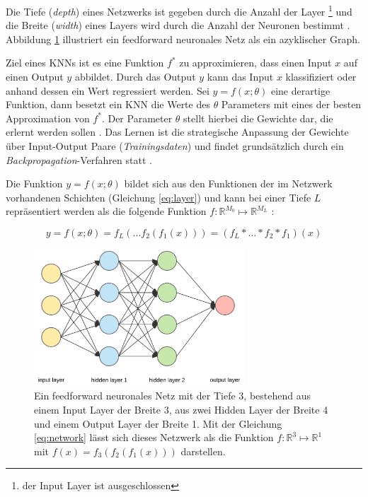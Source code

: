 Die Tiefe (\textit{depth}) eines Netzwerks ist gegeben durch die Anzahl der Layer \footnote{der Input Layer ist ausgeschlossen} und die Breite (\textit{width}) eines Layers wird durch die Anzahl der Neuronen bestimmt \cite{Goodfellow-et-al-2016}. 
Abbildung \ref{fig:neural_net} illustriert ein feedforward neuronales Netz als ein azyklischer Graph.

Ziel eines KNNs ist es eine Funktion $f^*$ zu approximieren, dass einen Input $x$ auf einen Output $y$ abbildet. Durch das Output $y$ kann das Input $x$ klassifiziert oder anhand dessen ein Wert regressiert werden. Sei $y = f(x; \theta)$ eine derartige Funktion, dann besetzt ein KNN die Werte des $\theta$ Parameters mit eines der besten Approximation von $f^*$. Der Parameter $\theta$ stellt hierbei die Gewichte dar, die erlernt werden sollen \cite{Goodfellow-et-al-2016}. 
Das Lernen ist die strategische Anpassung der Gewichte über Input-Output Paare (\textit{Trainingsdaten}) und findet grundsätzlich durch ein \textit{Backpropagation}-Verfahren statt \cite{Goodfellow-et-al-2016}. 

Die Funktion $y = f(x; \theta)$ bildet sich aus den Funktionen der im Netzwerk vorhandenen Schichten (Gleichung \ref{eq:layer}) und kann bei einer Tiefe $L$ repräsentiert werden als die folgende Funktion $f :  \mathbb{R}^{M_0} \mapsto \mathbb{R}^{M_L}$ \cite{Goodfellow-et-al-2016, bauckhageInformedMachineLearning}:
 
\begin{equation}
\label{eq:network}
y = f(x; \theta)=  f_L(...f_2(f_1(x))) = (f_L * ... * f_2 * f_1)(x)
\end{equation}


\begin{figure}[b]
	\centering
	\includegraphics[width=0.7\textwidth]{images/ann_conv/neural_net.png}
	\caption{Ein feedforward neuronales Netz mit der Tiefe 3, bestehend aus einem Input Layer der Breite 3, aus zwei Hidden Layer der Breite 4 und einem Output Layer der Breite 1. Mit der Gleichung \ref{eq:network} lässt sich dieses Netzwerk als die Funktion $f :  \mathbb{R}^{3} \mapsto \mathbb{R}^{1}$ mit $f(x)=f_3(f_2(f_1(x)))$ darstellen. }
	\label{fig:neural_net}
\end{figure}

